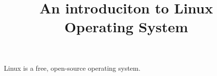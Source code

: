 \documentclass{article}
\title{An introduciton to Linux Operating System \emoji{penguin}}
\date{} %
\begin{document}
\maketitle
\color{blue}
Linux is a free, open-source operating system.
\end{document}
